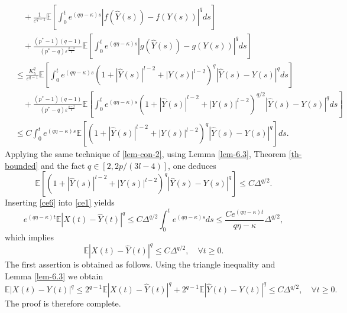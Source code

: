 \documentclass[10pt,a4paper]{amsart}
\renewenvironment{proof}{\noindent {\it  Proof.} \rm}{\pend}
\begin{document}
\begin{proof}
\begin{equation}
\begin{split}
	&\quad+ \frac{1}{{{\varepsilon ^{q - 1}}}}\mathbb{E}\left[ {\int_0^t {{e^{\left( {q\eta  - \kappa } \right)s}}{{\left| {f(\hat Y(s)) - f(Y(s))} \right|}^q}ds} } \right] \\
	&\quad+ \frac{{({p^*} - 1)(q - 1)}}{{({p^*} - q){\varepsilon ^{\frac{{q - 2}}{2}}}}}\mathbb{E}\left[ {\int_0^t {{e^{\left( {q\eta  - \kappa } \right)s}}{{\left| {g(\hat Y(s)) - g(Y(s))} \right|}^q}ds} } \right] \\
	&\le \frac{K_5^q}{{{\varepsilon ^{q - 1}}}}\mathbb{E}\left[ {\int_0^t {{e^{\left( {q\eta  - \kappa } \right)s}}{{\left( {1 + {{\left| {\hat Y(s)} \right|}^{l-2}} + {{\left| {Y(s)} \right|}^{l-2}}} \right)}^q}{{\left| {\hat Y(s) - Y(s)} \right|}^q}ds} } \right]  \\
	&\quad+ \frac{{({p^*} - 1)(q - 1)}}{{({p^*} - q){\varepsilon ^{\frac{{q - 2}}{2}}}}}\mathbb{E}\left[ {\int_0^t {{e^{\left( {q\eta  - \kappa } \right)s}}{{\left( {1 + {{\left| {\hat Y(s)} \right|}^{l-2}} + {{\left| {Y(s)} \right|}^{l-2}}} \right)}^{{q}/{2}}}{{\left| {\hat Y(s) - Y(s)} \right|}^q}ds} } \right] \\
	&\le C\int_0^t {{e^{\left( {q\eta  - \kappa } \right)s}}\mathbb{E}\left[ {{{\left( {1 + {{\left| {\hat Y(s)} \right|}^{l-2}} + {{\left| {Y(s)} \right|}^{l-2}}} \right)}^q}{{\left| { \hat Y(s) - Y(s)} \right|}^q}} \right]ds} .
\end{split}
\end{equation}
Applying the same technique of \eqref{lem-con-2}, using Lemma \ref{lem-6.3}, Theorem \ref{th-bounded} and the fact $q \in \left[ {2,2p/(3l - 4)} \right]$, one deduces
\begin{equation}  \label{ce6}
	\mathbb{E}\left[ {{{\left( {1 + {{\left| {\hat Y(s)} \right|}^{l-2}} + {{\left| {Y(s)} \right|}^{l-2}}} \right)}^q}{{\left| { \hat Y(s) - Y(s)} \right|}^q}} \right]  \le {C}\Delta^{{q}/{2}} . 
\end{equation} 
Inserting \eqref{ce6} into \eqref{ce1} yields
\begin{equation*}
	{e^{\left( {q\eta  - \kappa } \right)t}}\mathbb{E}{\left| {X(t) -  \hat Y(t)} \right|^q} \le C{\Delta ^{{q}/{2}}}\int_0^t {{e^{\left( {q\eta  - \kappa } \right)s}}ds} \le \frac{{C{e^{\left( {q\eta  - \kappa } \right)t}}}}{{q\eta  - \kappa }}{\Delta ^{{q}/{2}}},
\end{equation*} 
which implies
\begin{equation*}
	\mathbb{E}{\left| {X(t) -  \hat Y(t)} \right|^q} \le C\Delta^{{q}/{2}}, \quad \forall t \ge 0.
\end{equation*}
The first assertion is obtained as follows. Using the triangle inequality and Lemma \ref{lem-6.3} we obtain 
\begin{equation*}
	\mathbb{E}{\left| {X(t) -  Y(t)} \right|^q} \le {2^{q - 1}}\mathbb{E}{\left| {X(t) -  \hat Y(t)} \right|^q} + {2^{q - 1}}\mathbb{E}{\left| {\hat Y(t) - Y(t)} \right|^q} \le C\Delta^{{q}/{2}}, \quad \forall t\ge 0.
\end{equation*}
The proof is therefore complete.
\end{proof}
\end{document}
